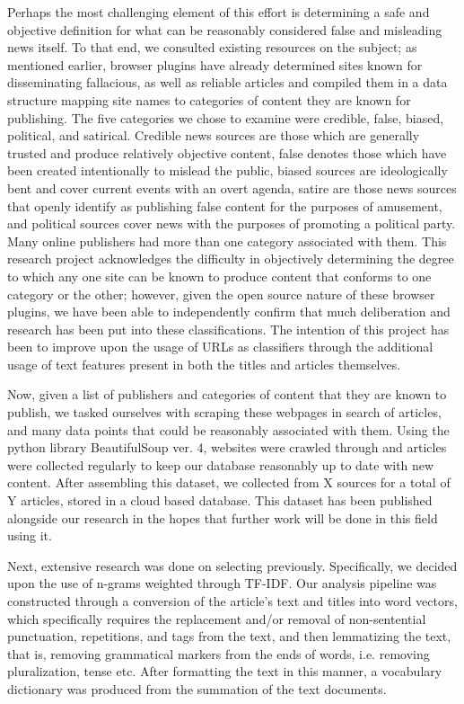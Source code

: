 \documentclass{article}
\begin{document}
Perhaps the most challenging element of this effort is determining a safe and objective definition for what can be reasonably considered false and misleading news itself. To that end, we consulted existing resources on the subject; as mentioned earlier, browser plugins have already determined sites known for disseminating fallacious, as well as reliable articles and compiled them in a data structure mapping site names to categories of content they are known for publishing. The five categories we chose to examine were credible, false, biased, political, and satirical. Credible news sources are those which are generally trusted and produce relatively objective content, false denotes those which have been created intentionally to mislead the public, biased sources are ideologically bent and cover current events with an overt agenda, satire are those news sources that openly identify as publishing false content for the purposes of amusement, and political sources cover news with the purposes of promoting a political party. Many online publishers had more than one category associated with them. This research project acknowledges the difficulty in objectively determining the degree to which any one site can be known to produce content that conforms to one category or the other; however, given the open source nature of these browser plugins, we have been able to independently confirm that much deliberation and research has been put into these classifications. The intention of this project has been to improve upon the usage of URLs as classifiers through the additional usage of text features present in  both the titles and articles themselves. \par
Now, given a list of publishers and categories of content that they are known to publish, we tasked  ourselves with scraping these webpages in search of articles, and many data points that could be reasonably associated with them. Using the python library BeautifulSoup ver. 4, websites were crawled through and articles were collected regularly to keep our database reasonably up to date with new content. After assembling this dataset, we collected from X sources for a total of Y articles, stored in a cloud based database. This dataset has been published alongside our research in the hopes that further work will be done in this field using it. \par
Next, extensive research was done on selecting previously. Specifically, we decided upon the use of n-grams weighted through TF-IDF. Our analysis pipeline was constructed through a conversion of the article's text and titles into word vectors, which specifically requires the replacement and/or removal of non-sentential punctuation, repetitions, and tags from the text, and then lemmatizing the text, that is, removing grammatical markers from the ends of words, i.e. removing pluralization, tense etc. 
After formatting the text in this manner, a vocabulary dictionary was produced from the summation of the text documents. 
\end{document}
